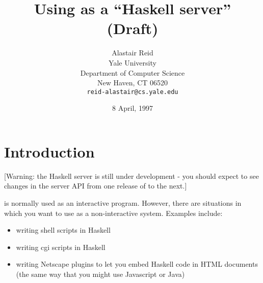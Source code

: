 \newcommand{\HeyPaul}[1]{\par{{\bf Hey Paul:} \sl #1}\par}
\newcommand{\ToDo}[1]{\par{{\bf ToDo:} \sl #1}\par}

\newenvironment{outline}{%
  \medbreak
  \noindent
  {\bf Outline: }
  \begingroup
    \nobreak
    \sl
}{%
  \endgroup
  \nobreak
  {\bf End outline.}
  \medbreak
}

%



\title{%
  Using \Hugs{} as a ``Haskell server''\\
  (Draft)%
}

\author{Alastair Reid\\
Yale University\\
Department of Computer Science\\
New Haven, CT 06520\\
{\tt reid-alastair@cs.yale.edu}}

\date{8 April, 1997}

\maketitle

\section{Introduction}\label{introduction}

[Warning: the Haskell server is still under development - you should
 expect to see changes in the server API from one release of \Hugs{} to
 the next.]

\Hugs{} is normally used as an interactive program.  However, there are
situations in which you want to use \Hugs{} as a non-interactive system.
Examples include:

\begin{itemize}
\item
 writing shell scripts in Haskell
\item
 writing cgi scripts in Haskell
\item
 writing Netscape plugins to let you embed Haskell code in HTML documents
 (the same way that you might use Javascript or Java)
\end{itemize}

